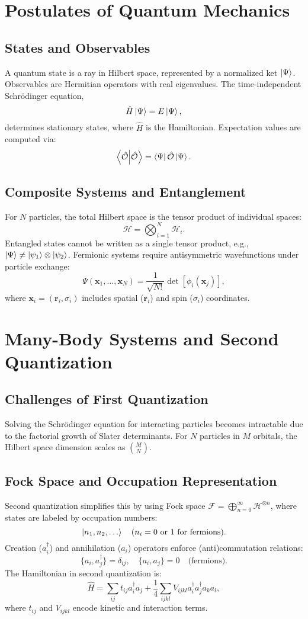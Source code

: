 \section{Postulates of Quantum Mechanics}
\subsection{States and Observables}
A quantum state is a ray in Hilbert space, represented by a normalized ket \(\ket{\Psi}\). Observables are Hermitian operators with real eigenvalues. The time-independent Schrödinger equation,  
\[
\hat{H}\ket{\Psi} = E\ket{\Psi},
\]
determines stationary states, where \(\hat{H}\) is the Hamiltonian. Expectation values are computed via:  
\[
\braket{\hat{\mathcal{O}}} = \bra{\Psi}\hat{\mathcal{O}}\ket{\Psi}.
\]

\subsection{Composite Systems and Entanglement}
For \(N\) particles, the total Hilbert space is the tensor product of individual spaces:  
\[
\mathcal{H} = \bigotimes_{i=1}^N \mathcal{H}_i.
\]
Entangled states cannot be written as a single tensor product, e.g., \(\ket{\Psi} \neq \ket{\psi_1} \otimes \ket{\psi_2}\). Fermionic systems require antisymmetric wavefunctions under particle exchange:  
\[
\Psi(\mathbf{x}_1, \dots, \mathbf{x}_N) = \frac{1}{\sqrt{N!}} \det[\phi_i(\mathbf{x}_j)],
\]
where \(\mathbf{x}_i = (\bm{r}_i, \sigma_i)\) includes spatial (\(\bm{r}_i\)) and spin (\(\sigma_i\)) coordinates.

\section{Many-Body Systems and Second Quantization}
\subsection{Challenges of First Quantization}
Solving the Schrödinger equation for interacting particles becomes intractable due to the factorial growth of Slater determinants. For \(N\) particles in \(M\) orbitals, the Hilbert space dimension scales as \(\binom{M}{N}\).

\subsection{Fock Space and Occupation Representation}
Second quantization simplifies this by using Fock space \(\mathcal{F} = \bigoplus_{n=0}^\infty \mathcal{H}^{\otimes n}\), where states are labeled by occupation numbers:  
\[
\ket{n_1, n_2, \dots} \quad (n_i = 0 \text{ or } 1 \text{ for fermions}).
\]
Creation (\(a_i^\dagger\)) and annihilation (\(a_i\)) operators enforce (anti)commutation relations:  
\[
\{a_i, a_j^\dagger\} = \delta_{ij}, \quad \{a_i, a_j\} = 0 \quad \text{(fermions)}.
\]
The Hamiltonian in second quantization is:  
\[
\hat{H} = \sum_{ij} t_{ij} a_i^\dagger a_j + \frac{1}{4} \sum_{ijkl} V_{ijkl} a_i^\dagger a_j^\dagger a_k a_l,
\]
where \(t_{ij}\) and \(V_{ijkl}\) encode kinetic and interaction terms.


